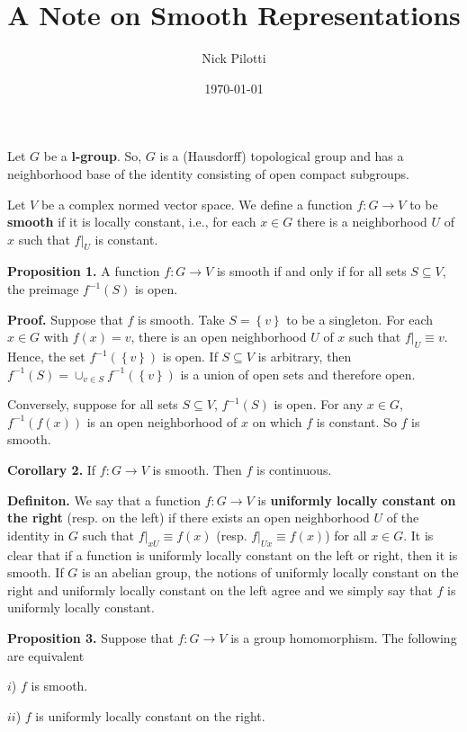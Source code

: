 \documentclass[12pt]{article}
\title{A Note on Smooth Representations}
\author{Nick Pilotti}
\date{\today}
\begin{document}
\maketitle

Let $G$ be a \textbf{l-group}. So, $G$ is a (Hausdorff) topological group and
has a neighborhood base of the identity consisting of open compact subgroups.

Let $V$ be a complex normed vector space. We define a function $f : G
\rightarrow V$ to be \textbf{smooth} if it is locally constant, i.e., for each
$x \in G$ there is a neighborhood $U$ of $x$ such that $f|_{U}$ is constant.

\textbf{Proposition 1.} A function $f : G \rightarrow V$ is smooth if and only if
for all sets $S \subseteq V$, the preimage $f^{-1}\left(S\right)$ is open.

\textbf{Proof.} Suppose that $f$ is smooth. Take $S = \left\{v\right\}$ to be a
singleton. For each $x \in G$ with $f\left(x\right) = v$, there is an open
neighborhood $U$ of $x$ such that $f|_{U} \equiv v$. Hence, the set
$f^{-1}\left(\left\{v\right\}\right)$ is open. If $S \subseteq V$ is arbitrary,
then $f^{-1}\left(S\right) = \cup_{v \in S} f^{-1}\left(\left\{v\right\}\right)$
is a union of open sets and therefore open.

Conversely, suppose for all sets $S \subseteq V$, $f^{-1}\left(S\right)$ is
open. For any $x \in G$, $f^{-1}\left(f\left(x\right)\right)$ is an open
neighborhood of $x$ on which $f$ is constant. So $f$ is smooth.

\textbf{Corollary 2.} If $f : G \rightarrow V$ is smooth. Then $f$ is continuous.

\textbf{Definiton.} We say that a function $f : G \rightarrow V$ is
\textbf{uniformly locally constant on the right} (resp. on the left) if there
exists an open neighborhood $U$ of the identity in $G$ such that $f|_{xU} \equiv
f\left(x\right)$ (resp. $f|_{Ux} \equiv f\left(x\right)$) for all $x \in G$. It
is clear that if a function is uniformly locally constant on the left or right,
then it is smooth. If $G$ is an abelian group, the notions of uniformly locally
constant on the right and uniformly locally constant on the left agree and we
simply say that $f$ is uniformly locally constant.

\textbf{Proposition 3.} Suppose that $f : G \rightarrow V$ is a group
homomorphism. The following are equivalent

$i$) $f$ is smooth.

$ii$) $f$ is uniformly locally constant on the right.
\end{document}
